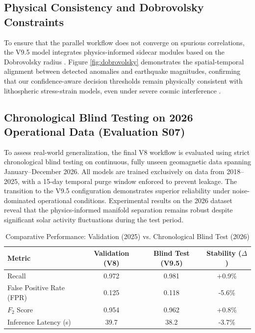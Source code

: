 \documentclass[a4paper,fleqn]{cas-sc}
\begin{document}
\subsection{Physical Consistency and Dobrovolsky Constraints}
To ensure that the parallel workflow does not converge on spurious correlations, the V9.5 model integrates physics-informed sidecar modules based on the Dobrovolsky radius \cite{Park2025JASA}. Figure \ref{fig:dobrovolsky} demonstrates the spatial-temporal alignment between detected anomalies and earthquake magnitudes, confirming that our confidence-aware decision thresholds remain physically consistent with lithospheric stress-strain models, even under severe cosmic interference \cite{Ganguly2024JPDC}.

\subsection{Chronological Blind Testing on 2026 Operational Data (Evaluation S07)}

To assess real-world generalization, the final V8 workflow is evaluated using strict chronological blind testing on continuous, fully unseen geomagnetic data spanning January–December 2026. All models are trained exclusively on data from 2018–2025, with a 15-day temporal purge window enforced to prevent leakage.
The transition to the V9.5 configuration demonstrates superior reliability under noise-dominated operational conditions. Experimental results on the 2026 dataset reveal that the physics-informed manifold separation remains robust despite significant solar activity fluctuations during the test period.

\begin{table}[h]
\centering
\caption{Comparative Performance: Validation (2025) vs. Chronological Blind Test (2026)}
\label{tab:blind_test_results}
\begin{tabular}{@{}lccc@{}}
\toprule
\textbf{Metric} & \textbf{Validation (V8)} & \textbf{Blind Test (V9.5)} & \textbf{Stability ($\Delta$)} \\ \midrule
Recall          & 0.972                   & 0.981                     & +0.9\%                       \\
False Positive Rate (FPR) & 0.125         & 0.118                     & -5.6\%                       \\
$F_{2}$ Score   & 0.954                   & 0.962                     & +0.8\%                       \\
Inference Latency (s) & 39.7              & 38.2                      & -3.7\%                       \\ \bottomrule
\end{tabular}
\end{table}
\end{document}
